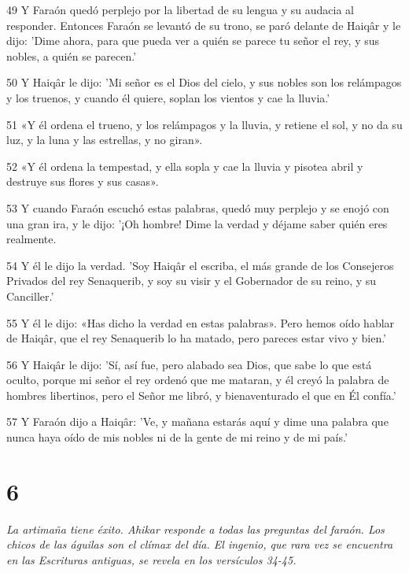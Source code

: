 \par 49 Y Faraón quedó perplejo por la libertad de su lengua y su audacia al responder. Entonces Faraón se levantó de su trono, se paró delante de Haiqâr y le dijo: 'Dime ahora, para que pueda ver a quién se parece tu señor el rey, y sus nobles, a quién se parecen.'

\par 50 Y Haiqâr le dijo: 'Mi señor es el Dios del cielo, y sus nobles son los relámpagos y los truenos, y cuando él quiere, soplan los vientos y cae la lluvia.'

\par 51 «Y él ordena el trueno, y los relámpagos y la lluvia, y retiene el sol, y no da su luz, y la luna y las estrellas, y no giran».

\par 52 «Y él ordena la tempestad, y ella sopla y cae la lluvia y pisotea abril y destruye sus flores y sus casas».

\par 53 Y cuando Faraón escuchó estas palabras, quedó muy perplejo y se enojó con una gran ira, y le dijo: '¡Oh hombre! Dime la verdad y déjame saber quién eres realmente.

\par 54 Y él le dijo la verdad. 'Soy Haiqâr el escriba, el más grande de los Consejeros Privados del rey Senaquerib, y soy su visir y el Gobernador de su reino, y su Canciller.'

\par 55 Y él le dijo: «Has dicho la verdad en estas palabras». Pero hemos oído hablar de Haiqâr, que el rey Senaquerib lo ha matado, pero pareces estar vivo y bien.'

\par 56 Y Haiqâr le dijo: 'Sí, así fue, pero alabado sea Dios, que sabe lo que está oculto, porque mi señor el rey ordenó que me mataran, y él creyó la palabra de hombres libertinos, pero el Señor me libró, y bienaventurado el que en Él confía.'

\par 57 Y Faraón dijo a Haiqâr: 'Ve, y mañana estarás aquí y dime una palabra que nunca haya oído de mis nobles ni de la gente de mi reino y de mi país.'

\chapter{6}

\par \textit{La artimaña tiene éxito. Ahikar responde a todas las preguntas del faraón. Los chicos de las águilas son el clímax del día. El ingenio, que rara vez se encuentra en las Escrituras antiguas, se revela en los versículos 34-45.}

